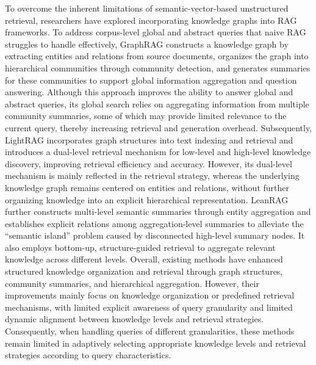\documentclass[preprint,12pt,authoryear]{elsarticle}
\begin{document}
To overcome the inherent limitations of semantic-vector-based unstructured retrieval, researchers have explored incorporating knowledge graphs into RAG frameworks. To address corpus-level global and abstract queries that naive RAG struggles to handle effectively, GraphRAG \citep{edge2024graphrag} constructs a knowledge graph by extracting entities and relations from source documents, organizes the graph into hierarchical communities through community detection, and generates summaries for these communities to support global information aggregation and question answering. Although this approach improves the ability to answer global and abstract queries, its global search relies on aggregating information from multiple community summaries, some of which may provide limited relevance to the current query, thereby increasing retrieval and generation overhead.
Subsequently, LightRAG \citep{guo2025lightrag} incorporates graph structures into text indexing and retrieval and introduces a dual-level retrieval mechanism for low-level and high-level knowledge discovery, improving retrieval efficiency and accuracy. However, its dual-level mechanism is mainly reflected in the retrieval strategy, whereas the underlying knowledge graph remains centered on entities and relations, without further organizing knowledge into an explicit hierarchical representation.
LeanRAG \citep{zhang2026leanrag} further constructs multi-level semantic summaries through entity aggregation and establishes explicit relations among aggregation-level summaries to alleviate the ``semantic island'' problem caused by disconnected high-level summary nodes. It also employs bottom-up, structure-guided retrieval to aggregate relevant knowledge across different levels.
Overall, existing methods have enhanced structured knowledge organization and retrieval through graph structures, community summaries, and hierarchical aggregation. However, their improvements mainly focus on knowledge organization or predefined retrieval mechanisms, with limited explicit awareness of query granularity and limited dynamic alignment between knowledge levels and retrieval strategies. Consequently, when handling queries of different granularities, these methods remain limited in adaptively selecting appropriate knowledge levels and retrieval strategies according to query characteristics.
\end{document}
